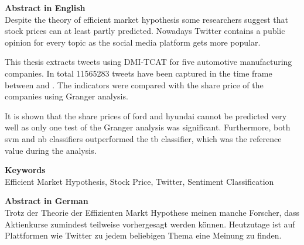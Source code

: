 
\newcommand*{\AbstractHead}[1]{%
{\noindent\color{header-blue}\Large\textbf{#1}}
\vspace{10pt}\\
}%

\newcommand*{\SomeSpace}{%
\vspace{\baselineskip}
}

\AbstractHead{Abstract in English}
\noindent
\normalsize
Despite the theory of efficient market hypothesis some researchers suggest that stock prices can at least partly predicted.
Nowadays Twitter contains a public opinion for every topic as the social media platform gets more popular.

This thesis extracts tweets using DMI-TCAT for five automotive manufacturing companies.
In total \num{11565283} tweets have been captured in the time frame between  and .
The indicators were compared with the share price of the companies using Granger analysis.

It is shown that the share prices of ford and hyundai cannot be predicted very well as only one test of the Granger analysis was significant.
Furthermore, both svm and nb classifiers outperformed the tb classifier, which was the reference value during the analysis.


\SomeSpace
\AbstractHead{Keywords}
\normalsize
\noindent
Efficient Market Hypothesis, Stock Price, Twitter, Sentiment Classification

\glsresetall
\SomeSpace

\AbstractHead{Abstract in German}
\noindent
\normalsize
Trotz der Theorie der Effizienten Markt Hypothese meinen manche Forscher, dass Aktienkurse zumindest teilweise vorhergesagt werden können.
Heutzutage ist auf Plattformen wie Twitter zu jedem beliebigen Thema eine Meinung zu finden.


